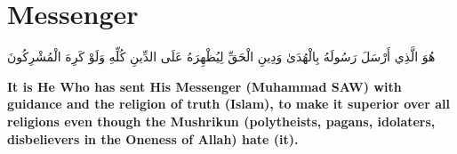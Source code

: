 \chapter{Messenger}
\begin{center}
    {\Huge    
        \begin{Arabic}
            هُوَ الَّذِي أَرْسَلَ رَسُولَهُ بِالْهُدَىٰ وَدِينِ الْحَقِّ لِيُظْهِرَهُ عَلَى الدِّينِ كُلِّهِ وَلَوْ كَرِهَ الْمُشْرِكُونَ
        \end{Arabic}
    }    
\end{center}
\vspace*{\fill}
\vspace{3cm}
\begin{center}
    \Large \textbf{It is He Who has sent His Messenger (Muhammad SAW) with guidance and the religion of truth (Islam), to make it superior over all religions even though the Mushrikun (polytheists, pagans, idolaters, disbelievers in the Oneness of Allah) hate (it).}
\end{center}

